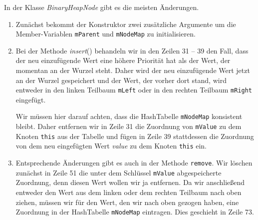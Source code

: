 In der Klasse \textsl{BinaryHeapNode} gibt es die meisten \"Anderungen.
\begin{enumerate}
\item Zun\"achst bekommt der Konstruktor zwei zus\"atzliche Argumente um die 
      Member-Variablen \texttt{mParent} und \texttt{mNodeMap} zu initialisieren. 
\item Bei der Methode \textsl{insert}() behandeln wir in den Zeilen 31 -- 39 
      den Fall, dass der neu einzuf\"ugende Wert eine h\"ohere Priorit\"at hat als der Wert, der
      momentan an der Wurzel steht.  Daher wird der neu einzuf\"ugende Wert
      jetzt an der Wurzel gespeichert und der Wert, der vorher dort stand,
      wird entweder in den linken Teilbaum \texttt{mLeft} oder in den
      rechten Teilbaum \texttt{mRight} eingef\"ugt.

      Wir m\"ussen hier darauf achten, dass die HashTabelle \texttt{mNodeMap} konsistent
      bleibt.  Daher entfernen wir in Zeile 31 die Zuordnung von \texttt{mValue} zu dem
      Knoten \texttt{this} aus der Tabelle und f\"ugen in Zeile 39 stattdessen 
      die Zuordnung von dem neu eingef\"ugten Wert \textsl{value} zu dem Knoten
      \texttt{this} ein.
\item Entsprechende \"Anderungen gibt es auch in der Methode \texttt{remove}.
      Wir l\"oschen zun\"achst in Zeile 51 die unter dem Schl\"ussel \texttt{mValue}
      abgespeicherte Zuordnung, denn diesen Wert wollen wir ja entfernen.
      Da wir anschlie{\ss}end entweder den Wert aus dem linken oder dem rechten Teilbaum 
      nach oben ziehen, m\"ussen wir f\"ur den Wert, den wir nach oben gezogen haben,
      eine Zuordnung in der HashTabelle \texttt{mNodeMap} eintragen. Dies geschieht
      in Zeile 73.


\end{enumerate}
